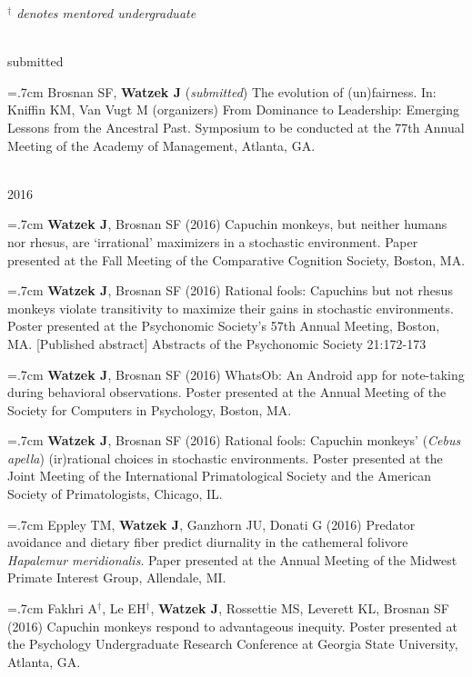 \documentclass[]{friggeri-cv}
\begin{document}
\hspace{.35cm} {\small{} \emph{${}^\dagger$ denotes mentored undergraduate}}

{\large{} ~\\[-.15cm] submitted}

\hangindent=.7cm Brosnan SF, \textbf{Watzek J} (\emph{submitted}) The evolution of (un)fairness. In: Kniffin KM, Van Vugt M (organizers) From Dominance to Leadership: Emerging Lessons from the Ancestral Past. Symposium to be conducted at the 77th Annual Meeting of the Academy of Management, Atlanta, GA.


{\large{} ~\\[-.15cm] 2016}

\hangindent=.7cm \textbf{Watzek J}, Brosnan SF (2016) Capuchin monkeys, but neither humans nor rhesus, are `irrational' maximizers in a stochastic environment. Paper presented at the Fall Meeting of the Comparative Cognition Society, Boston, MA.

\hangindent=.7cm \textbf{Watzek J}, Brosnan SF (2016) Rational fools: Capuchins but not rhesus monkeys violate transitivity to maximize their gains in stochastic environments. Poster presented at the Psychonomic Society's 57th Annual Meeting, Boston, MA. [Published abstract] Abstracts of the Psychonomic Society 21:172-173

\hangindent=.7cm \textbf{Watzek J}, Brosnan SF (2016) WhatsOb: An Android app for note-taking during behavioral observations. Poster presented at the Annual Meeting of the Society for Computers in Psychology, Boston, MA.

\hangindent=.7cm \textbf{Watzek J}, Brosnan SF (2016) Rational fools: Capuchin monkeys' (\emph{Cebus apella}) (ir)rational choices in stochastic environments. Poster presented at the Joint Meeting of the International Primatological Society and the American Society of Primatologists, Chicago, IL.

\hangindent=.7cm Eppley TM, \textbf{Watzek J}, Ganzhorn JU, Donati G (2016) Predator avoidance and dietary fiber predict diurnality in the cathemeral folivore \emph{Hapalemur meridionalis}. Paper presented at the Annual Meeting of the Midwest Primate Interest Group, Allendale, MI.

\hangindent=.7cm Fakhri A${}^\dagger$, Le EH${}^\dagger$, \textbf{Watzek J}, Rossettie MS, Leverett KL, Brosnan SF (2016) Capuchin monkeys respond to advantageous inequity. Poster presented at the Psychology Undergraduate Research Conference at Georgia State University, Atlanta, GA.
\end{document}
